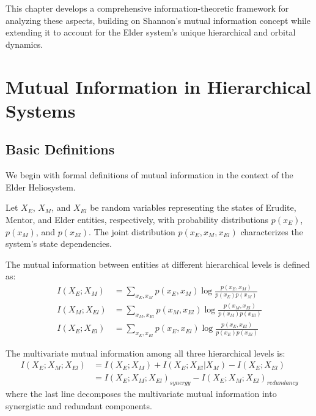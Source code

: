 This chapter develops a comprehensive information-theoretic framework for analyzing these aspects, building on Shannon's mutual information concept while extending it to account for the Elder system's unique hierarchical and orbital dynamics.

\section{Mutual Information in Hierarchical Systems}

\subsection{Basic Definitions}

We begin with formal definitions of mutual information in the context of the Elder Heliosystem.

\begin{definition}
Let $X_E$, $X_M$, and $X_{El}$ be random variables representing the states of Erudite, Mentor, and Elder entities, respectively, with probability distributions $p(x_E)$, $p(x_M)$, and $p(x_{El})$. The joint distribution $p(x_E, x_M, x_{El})$ characterizes the system's state dependencies.
\end{definition}

\begin{definition}
The mutual information between entities at different hierarchical levels is defined as:
\begin{align}
I(X_E; X_M) &= \sum_{x_E, x_M} p(x_E, x_M) \log \frac{p(x_E, x_M)}{p(x_E)p(x_M)} \\
I(X_M; X_{El}) &= \sum_{x_M, x_{El}} p(x_M, x_{El}) \log \frac{p(x_M, x_{El})}{p(x_M)p(x_{El})} \\
I(X_E; X_{El}) &= \sum_{x_E, x_{El}} p(x_E, x_{El}) \log \frac{p(x_E, x_{El})}{p(x_E)p(x_{El})}
\end{align}
\end{definition}

\begin{definition}
The multivariate mutual information among all three hierarchical levels is:
\begin{align}
I(X_E; X_M; X_{El}) &= I(X_E; X_M) + I(X_E; X_{El}|X_M) - I(X_E; X_{El}) \\
&= I(X_E; X_M; X_{El})_{synergy} - I(X_E; X_M; X_{El})_{redundancy}
\end{align}
where the last line decomposes the multivariate mutual information into synergistic and redundant components.
\end{definition}

